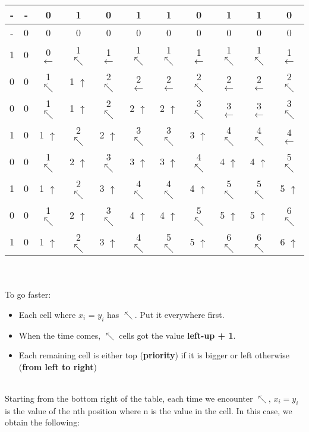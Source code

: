 \documentclass[11pt]{article}
\begin{document}
\begin{enumerate}
\begin{tabular}{ c | c c c c c c c c c c }
        - & - & 0 & 1 & 0 & 1 & 1 & 0 & 1 & 1 & 0 \\
        \hline
        - & 0 & 0 & 0 & 0 & 0 & 0 & 0 & 0 & 0 & 0 \\
        1 & 0 & 0 $\leftarrow$ & 1 $\nwarrow$ & 1 $\leftarrow$ & 1 $\nwarrow$ & 1 $\nwarrow$ & 1 $\leftarrow$ & 1 $\nwarrow$ & 1 $\nwarrow$ & 1 $\leftarrow$ \\
        0 & 0 & 1 $\nwarrow$ & 1 $\uparrow$ & 2 $\nwarrow$ & 2 $\leftarrow$ & 2 $\leftarrow$ & 2 $\nwarrow$ & 2 $\leftarrow$ & 2 $\leftarrow$ & 2 $\nwarrow$ \\
        0 & 0 & 1 $\nwarrow$ & 1 $\uparrow$ & 2 $\nwarrow$ & 2 $\uparrow$ & 2 $\uparrow$ & 3 $\nwarrow$ & 3 $\leftarrow$ & 3 $\leftarrow$ & 3 $\nwarrow$ \\
        1 & 0 & 1 $\uparrow$ & 2 $\nwarrow$ & 2 $\uparrow$ & 3 $\nwarrow$ & 3 $\nwarrow$ & 3 $\uparrow$ & 4 $\nwarrow$ & 4 $\nwarrow$ & 4 $\leftarrow$ \\
        0 & 0 & 1 $\nwarrow$ & 2 $\uparrow$ & 3 $\nwarrow$ & 3 $\uparrow$ & 3 $\uparrow$ & 4 $\nwarrow$ & 4 $\uparrow$ & 4 $\uparrow$ & 5 $\nwarrow$ \\
        1 & 0 & 1 $\uparrow$ & 2 $\nwarrow$ & 3 $\uparrow$ & 4 $\nwarrow$ & 4 $\nwarrow$ & 4 $\uparrow$ & 5 $\nwarrow$ & 5 $\nwarrow$ & 5 $\uparrow$ \\
        0 & 0 & 1 $\nwarrow$ & 2 $\uparrow$ & 3 $\nwarrow$ & 4 $\uparrow$ & 4 $\uparrow$ & 5 $\nwarrow$ & 5 $\uparrow$ & 5 $\uparrow$ & 6 $\nwarrow$ \\
        1 & 0 & 1 $\uparrow$ & 2 $\nwarrow$ & 3 $\uparrow$ & 4 $\nwarrow$ & 5 $\nwarrow$ & 5 $\uparrow$ & 6 $\nwarrow$ & 6 $\nwarrow$ & 6 $\uparrow$ \\
    \end{tabular}
    \\\\ To go faster:    
    \begin{itemize}
        \item Each cell where $x_i$ = $y_i$ has $\nwarrow$. Put it everywhere first.
        \item When the time comes, $\nwarrow$ cells got the value \textbf{left-up + 1}.
        \item Each remaining cell is either top (\textbf{priority}) if it is bigger or left otherwise (\textbf{from left to right})
    \end{itemize}
    \\ Starting from the bottom right of the table, each time we encounter $\nwarrow$, $x_i = y_i$ is the value of the nth position where n is the value in the cell. In this case, we obtain the following:

\end{enumerate}
\end{document}
